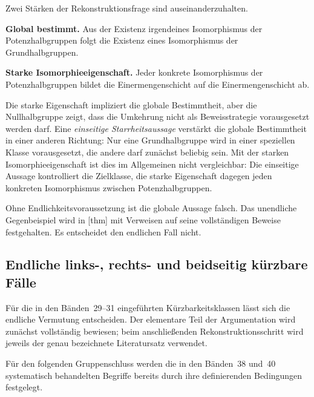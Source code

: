 \documentclass[main.tex]{subfiles}
\begin{document}
Zwei Stärken der Rekonstruktionsfrage sind auseinanderzuhalten.

\smallskip
\noindent\textbf{Global bestimmt.}
Aus der Existenz irgendeines Isomorphismus der Potenzhalbgruppen folgt die
Existenz eines Isomorphismus der Grundhalbgruppen.

\smallskip
\noindent\textbf{Starke Isomorphieeigenschaft.}
Jeder konkrete Isomorphismus der Potenzhalbgruppen bildet die
Einermengenschicht auf die Einermengenschicht ab.

\smallskip
Die starke Eigenschaft impliziert die globale Bestimmtheit, aber die
Nullhalbgruppe zeigt, dass die Umkehrung nicht als Beweisstrategie vorausgesetzt
werden darf.  Eine \emph{einseitige Starrheitsaussage} verstärkt die globale
Bestimmtheit in einer anderen Richtung: Nur eine Grundhalbgruppe wird in
einer speziellen Klasse vorausgesetzt, die andere darf zunächst beliebig
sein.  Mit der starken Isomorphieeigenschaft ist dies im Allgemeinen nicht
vergleichbar: Die einseitige Aussage kontrolliert die Zielklasse, die starke
Eigenschaft dagegen jeden konkreten Isomorphismus zwischen
Potenzhalbgruppen.

Ohne Endlichkeitsvoraussetzung ist die globale Aussage falsch.  Das
unendliche Gegenbeispiel wird in
[thm] mit Verweisen auf
seine vollständigen Beweise festgehalten. Es entscheidet den
endlichen Fall nicht.

\subsection{Endliche links-, rechts- und beidseitig kürzbare Fälle}

Für die in den Bänden~29--31 eingeführten Kürzbarkeitsklassen lässt sich die
endliche Vermutung entscheiden.  Der elementare Teil der Argumentation wird
zunächst vollständig bewiesen; beim anschließenden Rekonstruktionsschritt
wird jeweils der genau bezeichnete Literatursatz verwendet.

Für den folgenden Gruppenschluss werden die in den Bänden~38 und~40
systematisch behandelten Begriffe bereits durch ihre definierenden
Bedingungen festgelegt.

\end{document}
